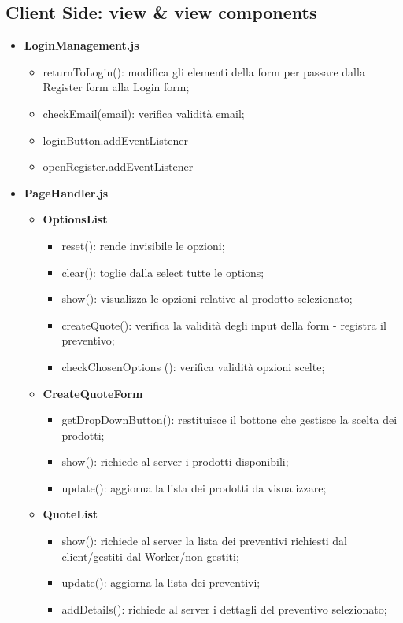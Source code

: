 \documentclass[a4paper, 12pt]{article}
\begin{document}
\subsection{Client Side: view \& view components}
\begin{itemize}
	\item \textbf{LoginManagement.js}
	\begin{itemize}
	\item returnToLogin(): modifica gli elementi della form per passare dalla Register form alla Login form;
	\item checkEmail(email): verifica validità email;
	\item loginButton.addEventListener
	\item openRegister.addEventListener
	\end{itemize}
	\item \textbf{PageHandler.js}
	\begin{itemize}
		\item \textbf{OptionsList}
		\begin{itemize}
		\item reset(): rende invisibile le opzioni;
		\item clear(): toglie dalla select tutte le options;
		\item show(): visualizza le opzioni relative al prodotto selezionato;
		\item createQuote(): verifica la validità degli input della form - registra il preventivo;
		\item checkChosenOptions (): verifica validità opzioni scelte;
		\end{itemize}
		\item \textbf{CreateQuoteForm}
		\begin{itemize}
		\item getDropDownButton(): restituisce il bottone che gestisce la scelta dei prodotti;
		\item show(): richiede al server i prodotti disponibili;
		\item update(): aggiorna la lista dei prodotti da visualizzare;
		\end{itemize}
		\item \textbf{QuoteList}
		\begin{itemize}
			\item show(): richiede al server la lista dei preventivi richiesti dal client/gestiti dal Worker/non gestiti;
			\item update(): aggiorna la lista dei preventivi;
			\item addDetails(): richiede al server i dettagli del preventivo selezionato;

\end{itemize}
\end{itemize}
\end{itemize}
\end{document}
